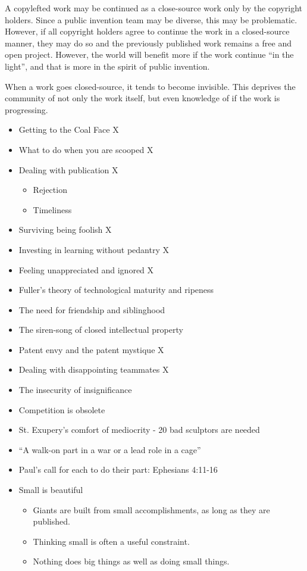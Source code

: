 \documentclass[
	fontsize=10pt, %
	twoside=false, %
	secnumdepth=1, %
]{kaobook}
\begin{document}
A copylefted work may be continued as a
close-source work only by the copyright holders.
Since a public invention team may be diverse,
this may be problematic. However, if all copyright
holders agree to continue the work in a closed-source
manner, they may do so and the previously published
work remains a free and open project.
However, the world will benefit more if the
work continue ``in the light'', and that
is more in the spirit of public invention.

When a work goes closed-source, it tends
to become invisible.
This deprives the community of not
only the work itself, but even knowledge of if the work is
progressing.

\begin{itemize}
\item Getting to the Coal Face X
\item What to do when you are scooped X
\item Dealing with publication X
  \begin{itemize}
\item Rejection
\item Timeliness
\end{itemize}
\item Surviving being foolish X
\item Investing in learning without pedantry X
\item Feeling unappreciated and ignored X
\item Fuller’s theory of technological maturity and ripeness
\item The need for friendship and siblinghood
\item The siren-song of closed intellectual property
\item Patent envy and the patent mystique X
\item Dealing with disappointing teammates X
\item The insecurity of insignificance
\item Competition is obsolete
\item St. Exupery’s comfort of mediocrity - 20 bad sculptors are needed
\item “A walk-on part in a war or a lead role in a cage”
\item Paul’s call for each to do their part: Ephesians 4:11-16
\item Small is beautiful
  \begin{itemize}
\item Giants are built from small accomplishments, as long as they are published.
\item Thinking small is often a useful constraint.
\item Nothing does big things as well as doing small things.
\end{itemize}
\end{itemize}
\end{document}
